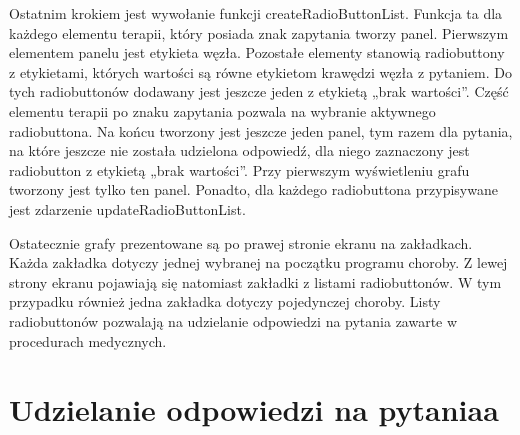 \documentclass[oneside,a4paper]{book}
\begin{document}
\begin{spacing}{1.5}
Ostatnim krokiem jest wywołanie funkcji createRadioButtonList. Funkcja ta dla każdego elementu terapii, który posiada znak zapytania tworzy panel. Pierwszym elementem panelu jest etykieta węzła. Pozostałe elementy stanowią radiobuttony z etykietami, których wartości są równe etykietom krawędzi węzła z pytaniem. Do tych radiobuttonów dodawany jest jeszcze jeden z etykietą „brak wartości”. Część elementu terapii po znaku zapytania pozwala na wybranie aktywnego radiobuttona. Na końcu tworzony jest jeszcze jeden panel, tym razem dla pytania, na które jeszcze nie została udzielona odpowiedź, dla niego zaznaczony jest radiobutton z etykietą „brak wartości”. Przy pierwszym wyświetleniu grafu tworzony jest tylko ten panel. Ponadto, dla każdego radiobuttona przypisywane jest zdarzenie updateRadioButtonList.
 
Ostatecznie grafy prezentowane są po prawej stronie ekranu na zakładkach. Każda zakładka dotyczy jednej wybranej na początku programu choroby. Z lewej strony ekranu pojawiają się natomiast zakładki z listami radiobuttonów. W tym przypadku również jedna zakładka dotyczy pojedynczej choroby. Listy radiobuttonów pozwalają na udzielanie odpowiedzi na pytania zawarte w procedurach medycznych.


\section{Udzielanie odpowiedzi na pytaniaa}


\end{spacing}
\end{document}
